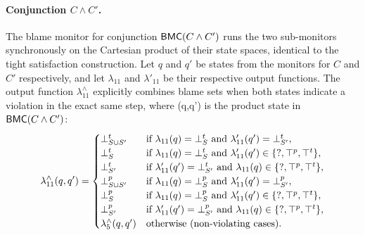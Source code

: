 \begin{definition}
\paragraph{Conjunction $C \wedge C'$.}
The blame monitor for conjunction $\mathsf{BMC}(C \wedge C')$ runs the two sub-monitors synchronously on the Cartesian product of their state spaces, identical to the tight satisfaction construction. Let $q$ and $q'$ be states from the monitors for $C$ and $C'$ respectively, and let $\lambda_{11}$ and $\lambda'_{11}$ be their respective output functions. The output function $\lambda_{11}^{\wedge}$ explicitly combines blame sets when both states indicate a violation in the exact same step, where (q,q') is the product state in $\mathsf{BMC}(C \wedge C')$:
\[
\lambda_{11}^{\wedge}(q, q') =
\begin{cases}
\mathbin{\bot^{t}_{S \cup S'}} & \text{if } \lambda_{11}(q) = \mathbin{\bot^{t}_{S}} \text{ and } \lambda'_{11}(q') = \mathbin{\bot^{t}_{S'}}, \\
\mathbin{\bot^{t}_{S}} & \text{if } \lambda_{11}(q) = \mathbin{\bot^{t}_{S}} \text{ and } \lambda'_{11}(q') \in \{\mathsf{?}, \top^p, \top^t\}, \\
\mathbin{\bot^{t}_{S'}} & \text{if } \lambda'_{11}(q') = \mathbin{\bot^{t}_{S'}} \text{ and } \lambda_{11}(q) \in \{\mathsf{?}, \top^p, \top^t\}, \\
\mathbin{\bot^{p}_{S \cup S'}} & \text{if } \lambda_{11}(q) = \mathbin{\bot^{p}_{S}} \text{ and } \lambda'_{11}(q') = \mathbin{\bot^{p}_{S'}}, \\
\mathbin{\bot^{p}_{S}} & \text{if } \lambda_{11}(q) = \mathbin{\bot^{p}_{S}} \text{ and } \lambda'_{11}(q') \in \{\mathsf{?}, \top^p, \top^t\}, \\
\mathbin{\bot^{p}_{S'}} & \text{if } \lambda'_{11}(q') = \mathbin{\bot^{p}_{S'}} \text{ and } \lambda_{11}(q) \in \{\mathsf{?}, \top^p, \top^t\}, \\
\lambda_{5}^{\wedge}(q, q') & \text{otherwise (non-violating cases)}.
\end{cases}
\]


\end{definition}
